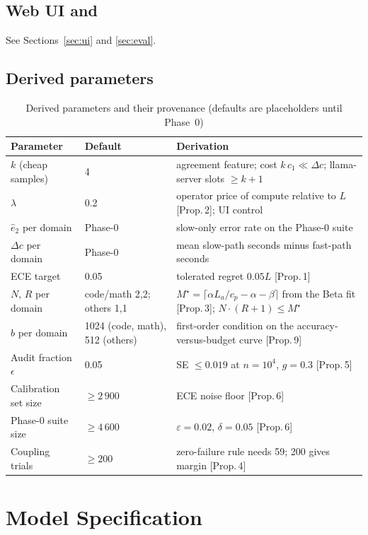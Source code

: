 \documentclass[11pt,a4paper]{article}
\begin{document}
\subsection{Web UI and \Harness}
See Sections~\ref{sec:ui} and \ref{sec:eval}.

\subsection{Derived parameters}
\begin{table}[h]\centering\small\caption{Derived parameters and their provenance (defaults are placeholders until Phase~0)}\label{tab:caps}
\begin{tabular}{@{}p{3.2cm}p{3.0cm}p{9.0cm}@{}}\toprule Parameter & Default & Derivation\\\midrule
$k$ (cheap samples) & 4 & agreement feature; cost $k\,c_1\ll\Delta c$; llama-server slots $\ge k+1$\\
$\lambda$ & 0.2 & operator price of compute relative to $L$ [Prop.\,2]; UI control\\
$\hat e_2$ per domain & Phase-0 & slow-only error rate on the Phase-0 suite\\
$\Delta c$ per domain & Phase-0 & mean slow-path seconds minus fast-path seconds\\
ECE target & 0.05 & tolerated regret $0.05L$ [Prop.\,1]\\
$N$, $R$ per domain & code/math 2,2; others 1,1 & $M^\star=\lceil\alpha L_a/c_p-\alpha-\beta\rceil$ from the Beta fit [Prop.\,3]; $N\cdot(R{+}1)\le M^\star$\\
$b$ per domain & 1024 (code, math), 512 (others) & first-order condition on the accuracy-versus-budget curve [Prop.\,9]\\
Audit fraction $\epsilon$ & 0.05 & SE $\le0.019$ at $n=10^4$, $g=0.3$ [Prop.\,5]\\
Calibration set size & $\ge2\,900$ & ECE noise floor [Prop.\,6]\\
Phase-0 suite size & $\ge4\,600$ & $\varepsilon=0.02$, $\delta=0.05$ [Prop.\,6]\\
Coupling trials & $\ge200$ & zero-failure rule needs 59; 200 gives margin [Prop.\,4]\\
\bottomrule\end{tabular}\end{table}

\section{Model Specification}
\label{sec:models}
\end{document}
